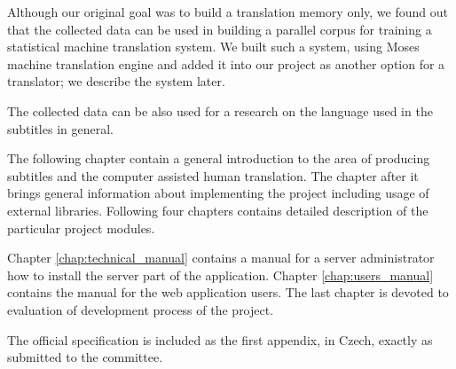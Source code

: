 Although our original goal was to build a translation memory only, we found out that the collected data can be used in building a parallel corpus for training a statistical machine translation system. We built such a system, using Moses machine translation engine and added it into our project as another option for a translator; we describe the system later.

The collected data can be also used for a research on the language used in the subtitles in general.

The following chapter contain a general introduction to the area of producing subtitles and the computer assisted human translation. The chapter after it brings general information about implementing the project including usage of external libraries. Following four chapters contains detailed description of the particular project modules.

Chapter \ref{chap:technical_manual} contains a manual for a server administrator how to install the server part of the application. Chapter \ref{chap:users_manual} contains the manual for the web application users. The last chapter is devoted to evaluation of development process of the project.

The official specification is included as the first appendix, in Czech, exactly as submitted to the committee.